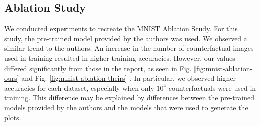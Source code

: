 
\newpage
\begin{appendices}
  


\section{Ablation Study}

We conducted experiments to recreate the MNIST Ablation Study. For this study, the pre-trained model provided by the authors was used. We observed a similar trend to the authors. An increase in the number of counterfactual images used in training resulted in higher training accuracies. However, our values differed significantly from those in the report, as seen in Fig. \ref{fig:mnist-ablation-ours} and Fig.  \ref{fig:mnist-ablation-theirs} . In particular, we observed higher accuracies for each dataset, especially when only $10^4$ counterfactuals were used in training. This difference may be explained by differences between the pre-trained models provided by the authors and the models that were used to generate the plots.



\end{appendices}
